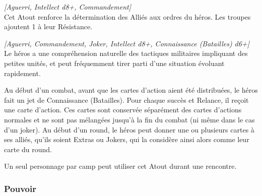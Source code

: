 \begin{description}[align=left]
    \item [Serrez les rangs !]
    	\emph{[Aguerri, Intellect d8+, Commandement]}\\
        Cet Atout renforce la détermination des Alliés aux ordres du héros. Les troupes ajoutent 1 à leur Résistance.

    \item [Tacticien]
    	\emph{[Aguerri, Commandement, Joker, Intellect d8+, Connaissance (Batailles) d6+]}\\
        Le héros a une compréhension naturelle des tactiques militaires impliquant des petites unités, et peut fréquemment tirer parti d’une situation évoluant rapidement.

        Au début d’un combat, avant que les cartes d’action aient été distribuées, le héros fait un jet de Connaissance (Batailles). Pour chaque succès et Relance, il reçoit une carte d’action. Ces cartes sont conservée séparément des cartes d’actions normales et ne sont pas mélangées jusqu’à la fin du combat (ni même dans le cas d’un joker). Au début d’un round, le héros peut donner une ou plusieurs cartes à ses alliés, qu’ils soient Extras ou Jokers, qui la considère ainsi alors comme leur carte du round.

        Un seul personnage par camp peut utiliser cet Atout durant une rencontre.

\end{description}

\newpage
\subsubsection{Pouvoir}

